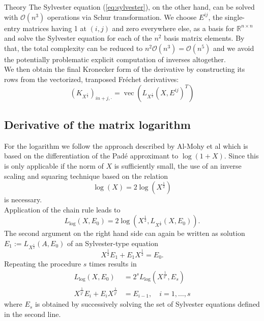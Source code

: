 \begin{chapter}{Theory}
The Sylvester equation (\ref{eq:sylvester}), on the other hand, can be solved with $\mathcal{O}(n^3)$ operations via Schur transformation. We choose $E^{ij}$, the single-entry
matrices having 1 at $(i,j)$ and zero everywhere else, as a basis for $\mathbb{R}^{n\times n}$ and solve the Sylvester equation for each of the $n^2$ 
basis matrix elements. By that, the total complexity can be reduced to $n^2\mathcal{O}(n^3)=\mathcal{O}(n^5)$ and we avoid the 
potentially problematic explicit computation of inverses altogether.\\

We then obtain the final Kronecker form of the derivative by constructing its rows from the vectorized, tranposed Fr\'{e}chet derivatives:
\begin{equation}
    \left(K_{X^{\frac{1}{2}}}\right)_{in + j,\cdot} = \operatorname{vec}\left(L_{X^{\frac{1}{2}}}(X,E^{ij})^T\right) 
\end{equation}

\subsection{Derivative of the matrix logarithm} %
\label{sub:Derivative of the matrix logarithm}
For the logarithm we follow the approach described by Al-Mohy et al \cite{AlmohyFrechet} which is based on the differentiation of the Pad\'{e} approximant to $\log(1+X)$.
Since this is only applicable if the norm of $X$ is sufficiently small, the  use of an inverse scaling and squaring technique based on the relation
\begin{equation}
    \log(X) = 2\log(X^{\frac{1}{2}})
\end{equation}
is necessary.\\

Application of the chain rule leads to
\begin{equation}
    L_{\log}(X,E_0) = 2\log\left(X^{\frac{1}{2}},L_{X^{\frac{1}{2}}}(X,E_0)\right).
\end{equation}
The second argument on the right hand side can again be written as solution $E_1:=L_{X^{\frac{1}{2}}}(A,E_0)$ of an Sylvester-type equation
\begin{equation}
    X^{\frac{1}{2}}E_1+E_{1}X^{\frac{1}{2}}=E_0.
\end{equation}
Repeating the procedure $s$ times results in
\begin{align}
    L_{\log}(X,E_0)&=2^sL_{\log}\left(X^{\frac{1}{2^s}},E_s\right)\\
    X^{\frac{1}{2^{i}}}E_i+E_iX^{\frac{1}{2^{i}}}&=E_{i-1},\quad i=1,\ldots,s
\end{align}
where $E_s$ is obtained by successively solving the set of Sylvester equations defined in the second line.\\


\end{chapter}
